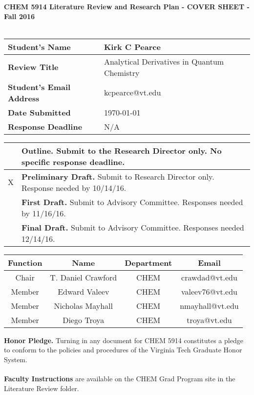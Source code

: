 
\begin{table}
\centering
{\bf CHEM 5914 Literature Review and Research Plan - COVER SHEET - Fall 2016} \\~\\
\renewcommand{\arraystretch}{1.5}
\begin{tabular}{|l|l|}
    \hline
    {\bf Student's Name} & Kirk C Pearce \\
    \hline
    {\bf Review Title} & Analytical Derivatives in Quantum Chemistry \\
    \hline
    {\bf Student's Email Address} & kcpearce@vt.edu \\
    \hline
    {\bf Date Submitted} & \today \\
    \hline
    {\bf Response Deadline} & N/A \\
    \hline
\end{tabular}

\vspace{10mm}

\begin{tabular}{|c|l|}
    \hline
    & {\bf Outline.} Submit to the Research Director only. No specific response deadline. \\
    \hline
    X & {\bf Preliminary Draft.} Submit to Research Director only. Response needed by 10/14/16. \\
    \hline
    & {\bf First Draft.} Submit to Advisory Committee. Responses needed by 11/16/16. \\
    \hline
    & {\bf Final Draft.} Submit to Advisory Committee. Responses needed 12/14/16. \\
    \hline
\end{tabular}

\vspace{10mm}

\begin{tabular}{|c|c|c|c|}
    \hline
    {\bf Function} & {\bf Name} & {\bf Department} & {\bf Email} \\
    \hline
    Chair & T. Daniel Crawford & CHEM & crawdad@vt.edu \\
    \hline
    Member & Edward Valeev & CHEM & valeev76@vt.edu \\
    \hline
    Member & Nicholas Mayhall & CHEM & nmayhall@vt.edu \\
    \hline
    Member & Diego Troya & CHEM & troya@vt.edu \\
    \hline
\end{tabular}
\end{table}
\begin{singlespacing}
\noindent
{\bf Honor Pledge.} Turning in any document for CHEM 5914 constitutes a pledge to conform to the policies and procedures of the Virginia Tech Graduate Honor System. \\~\\
{\bf Faculty Instructions} are available on the CHEM Grad Program site in the Literature Review folder.
\end{singlespacing}




